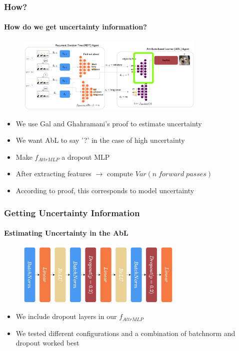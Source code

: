 \documentclass[9pt]{beamer}
\begin{document}
\begin{frame}
\frametitle{How?}
\framesubtitle{How do we get uncertainty information?}\begin{figure}
	\centering
	\includegraphics[width=0.8\textwidth]{images/where_is_uncertainty.pdf} 
\end{figure}
\begin{itemize}
	\item We use Gal and Ghahramani's \cite{gal2016dropout} proof to estimate uncertainty 
	\item We want AbL to say '?' in the case of high uncertainty
	\item Make $f_{AttrMLP}$ a dropout MLP
	\item After extracting features $\rightarrow$ compute $Var(n \;forward\;passes)$
	\item According to proof, this corresponds to model uncertainty
\end{itemize}
\end{frame}


\begin{frame}
\frametitle{Getting Uncertainty Information}
\framesubtitle{Estimating Uncertainty in the AbL}
\begin{figure}
	\centering
	\includegraphics[width=0.7\textwidth]{images/f_attrMLP.pdf}
\end{figure}
\begin{itemize}
	\item We include dropout layers in our $f_{AttrMLP}$
	\item We tested different configurations and a combination of batchnorm and dropout worked best
\end{itemize}
\end{frame}
\end{document}
